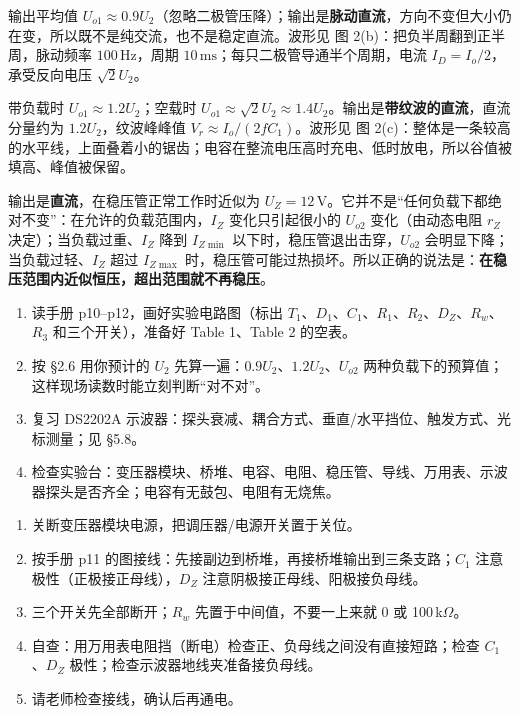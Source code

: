 \documentclass[11pt]{ctexart}
\let\orighdr\hdr
\renewcommand{\hdr}[2]{\needspace{12\baselineskip}\orighdr{#1}{#2}}
\let\origsubhdr\subhdr
\renewcommand{\subhdr}[1]{\needspace{3\baselineskip}\origsubhdr{#1}}
\begin{document}

输出平均值 $U_{o1}\approx0.9U_2$（忽略二极管压降）；输出是\textbf{脉动直流}，方向不变但大小仍在变，所以既不是纯交流，也不是稳定直流。波形见 图 2(b)：把负半周翻到正半周，脉动频率 $100\,\mathrm{Hz}$，周期 $10\,\mathrm{ms}$；每只二极管导通半个周期，电流 $I_D=I_o/2$，承受反向电压 $\sqrt2U_2$。


带负载时 $U_{o1}\approx1.2U_2$；空载时 $U_{o1}\approx\sqrt2U_2\approx1.4U_2$。输出是\textbf{带纹波的直流}，直流分量约为 $1.2U_2$，纹波峰峰值 $V_r\approx I_o/(2fC_1)$。波形见 图 2(c)：整体是一条较高的水平线，上面叠着小的锯齿；电容在整流电压高时充电、低时放电，所以谷值被填高、峰值被保留。


输出是\textbf{直流}，在稳压管正常工作时近似为 $U_Z=12\,\mathrm{V}$。它并不是“任何负载下都绝对不变”：在允许的负载范围内，$I_Z$ 变化只引起很小的 $U_{o2}$ 变化（由动态电阻 $r_Z$ 决定）；当负载过重、$I_Z$ 降到 $I_{Z\min}$ 以下时，稳压管退出击穿，$U_{o2}$ 会明显下降；当负载过轻、$I_Z$ 超过 $I_{Z\max}$ 时，稳压管可能过热损坏。所以正确的说法是：\textbf{在稳压范围内近似恒压，超出范围就不再稳压}。



\begin{enumerate}
  \item 读手册 p10--p12，画好实验电路图（标出 $T_1$、$D_1$、$C_1$、$R_1$、$R_2$、$D_Z$、$R_w$、$R_3$ 和三个开关），准备好 Table 1、Table 2 的空表。
  \item 按 §2.6 用你预计的 $U_2$ 先算一遍：$0.9U_2$、$1.2U_2$、$U_{o2}$ 两种负载下的预算值；这样现场读数时能立刻判断“对不对”。
  \item 复习 DS2202A 示波器：探头衰减、耦合方式、垂直/水平挡位、触发方式、光标测量；见 §5.8。
  \item 检查实验台：变压器模块、桥堆、电容、电阻、稳压管、导线、万用表、示波器探头是否齐全；电容有无鼓包、电阻有无烧焦。
\end{enumerate}


\begin{enumerate}
  \item 关断变压器模块电源，把调压器/电源开关置于关位。
  \item 按手册 p11 的图接线：先接副边到桥堆，再接桥堆输出到三条支路；$C_1$ 注意极性（正极接正母线），$D_Z$ 注意阴极接正母线、阳极接负母线。
  \item 三个开关先全部断开；$R_w$ 先置于中间值，不要一上来就 0 或 100\,k$\Omega$。
  \item 自查：用万用表电阻挡（断电）检查正、负母线之间没有直接短路；检查 $C_1$、$D_Z$ 极性；检查示波器地线夹准备接负母线。
  \item 请老师检查接线，确认后再通电。
\end{enumerate}
\end{document}
